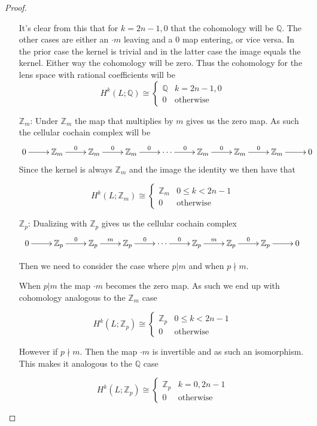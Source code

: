 \documentclass[10pt]{article}
\newcommand{\bb}[1]{\mathbb{#1}}
\theoremstyle{remark}
\begin{document}
\begin{proof}
\begin{itemize}
    It's clear from this that for $k=2n-1,0$ that the cohomology will be $\bb{Q}$. The
    other cases are either an $\cdot m$ leaving and a $0$ map entering, or vice versa.
    In the prior case the kernel is trivial and in the latter case the image equals the
    kernel. Either way the cohomology will be zero. Thus the cohomology for the lens
    space with rational coefficients will be
    \[
      H^k(L;\bb{Q}) \cong  
      \left\{
        \begin{array}{ll}
          \bb{Q} & k=2n-1,0\\
          0 & \text{otherwise}
        \end{array}
      \right.
    \]
  \item[$\bb{Z}_m$:] Under $\bb{Z}_m$ the map that multiplies by $m$ gives us
    the zero map. As such the cellular cochain complex will be
    \[
      \xymatrix{
        0 \ar[r] & \bb{Z}_m \ar[r]^0 & \bb{Z}_m \ar[r]^0 & \bb{Z}_m \ar[r]^0 & \cdots \ar[r]^0 & \bb{Z}_m \ar[r]^0 & \bb{Z}_m \ar[r]^0 & \bb{Z}_m \ar[r] & 0
      }
    \]
    Since the kernel is always $\bb{Z}_m$ and the image the identity we then have that

    \[
      H^k(L;\bb{Z}_m) \cong  
      \left\{
        \begin{array}{ll}
          \bb{Z}_m & 0\leq k < 2n-1\\
          0 & \text{otherwise}
        \end{array}
      \right.
    \]
  \item[$\bb{Z}_p$:]
    Dualizing with $\bb{Z}_p$ gives us the cellular cochain complex
    \[
      \xymatrix{
        0 \ar[r] & \bb{Z}_p \ar[r]^0 & \bb{Z}_p \ar[r]^m & \bb{Z}_p \ar[r]^0 & \cdots \ar[r]^0 & \bb{Z}_p \ar[r]^m & \bb{Z}_p \ar[r]^0 & \bb{Z}_p \ar[r] & 0
      }
    \]

    Then we need to consider the case where $p|m$ and when $p\nmid m$.

    When $p|m$ the map $\cdot m$ becomes the zero map. As such we end up
    with cohomology analogous to the $\bb{Z}_m$ case

    \[
      H^k(L;\bb{Z}_p) \cong  
      \left\{
        \begin{array}{ll}
          \bb{Z}_p & 0\leq k<2n-1\\
          0 & \text{otherwise}
        \end{array}
      \right.
    \]

    However if $p\nmid m$. Then the map $\cdot m$ is invertible and as such an
    isomorphism. This makes it analogous to the $\bb{Q}$ case

    \[
      H^k(L;\bb{Z}_p) \cong  
      \left\{
        \begin{array}{ll}
          \bb{Z}_p & k=0,2n-1\\
          0 & \text{otherwise}
        \end{array}
      \right.
    \]
  \end{itemize}
\end{proof}
\end{document}
